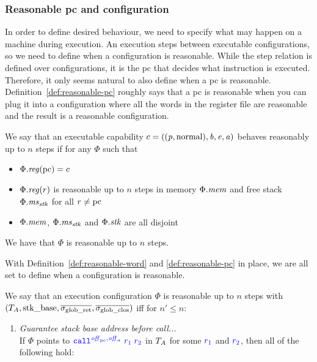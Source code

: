 \documentclass[acmsmall,screen]{acmart}\settopmatter{}
\renewcommand{\perm}{\var{p}}
\newenvironment{jversion}%
    {\color{OliveGreen}}{}
\begin{document}
\begin{jversion}
\subsubsection{Reasonable pc and configuration}
In order to define desired behaviour, we need to specify what may happen on a machine during execution.
An execution steps between executable configurations, so we need to define when a configuration is reasonable.
While the step relation is defined over configurations, it is the pc that decides what instruction is executed.
Therefore, it only seems natural to also define when a pc is reasonable.
Definition~\ref{def:reasonable-pc} roughly says that a pc is reasonable when you can plug it into a configuration where all the words in the register file are reasonable and the result is a reasonable configuration.
  \begin{definition}[Reasonable pc]
    \label{def:reasonable-pc}
    We say that an executable capability $c =
    ((\perm,\normal),\baddr,\eaddr,\aaddr)$ behaves reasonably up to $n$ steps
    if for any $\Phi$ such that
    \begin{itemize}
    \item $\Phi.\reg(\pcreg) = c$
    \item $\Phi.\reg(r)$ is reasonable up to $n$ steps in memory $\Phi.\mathit{mem}$ and
      free stack $\Phi.\mathit{ms}_{\mathit{stk}}$ for all $r \neq \mathrm{pc}$
    \item $\Phi.\mathit{mem}$, $\Phi.\mathit{ms}_{\mathit{stk}}$ and $\Phi.\mathit{stk}$ are all disjoint
    \end{itemize}
    We have that $\Phi$ is reasonable up to $n$ steps.
  \end{definition}
  With Definition~\ref{def:reasonable-word} and \ref{def:reasonable-pc} in place, we are all set to define when a configuration is reasonable.
  \begin{definition}
    \label{def:reasonable-conf}
    We say that an execution configuration $\Phi$ is reasonable up to $n$ steps with $(T_{A},\mathrm{stk\_base},\overline{\sigma_{\mathrm{glob\_ret}}},\overline{\sigma_{\mathrm{glob\_clos}}})$ 
    iff for $n' \leq n$:
    \begin{enumerate}
    \item \label{item:guarantee-stk-base} \emph{Guarantee stack base address before call...} \\
      If $\Phi$ points to $\src{\scall{\offpc,\offsigma}{r_1}{r_2}}$ in $T_{A}$
      for some ${\color{blue} r_1}$ and ${\color{blue} r_2}$,
      then all of the following hold:
\end{enumerate}
\end{definition}
\end{jversion}
\end{document}
